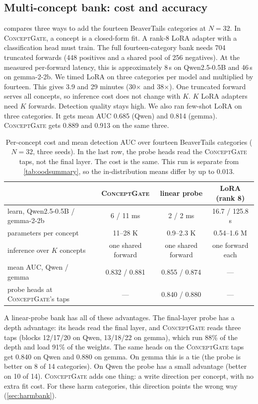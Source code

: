 \documentclass[11pt]{article}
\newcommand{\cg}{\textsc{ConceptGate}}
\begin{document}
\subsection{Multi-concept bank: cost and accuracy}
\label{sec:bank}
 compares three ways to add the fourteen BeaverTails categories at $N=32$. In \cg{}, a
concept is a closed-form fit. A rank-8 LoRA adapter with a classification head must train. The full
fourteen-category bank needs 704 truncated forwards (448 positives and a shared pool of 256 negatives).
At the measured per-forward latency, this is approximately 8\,s on Qwen2.5-0.5B and 46\,s on gemma-2-2b. We timed LoRA on three categories
per model and multiplied by fourteen. This gives 3.9 and 29 minutes (30$\times$ and 38$\times$). One truncated forward serves all concepts, so inference cost does not change with $K$. $K$ LoRA adapters need $K$ forwards. Detection quality stays high. We also ran
few-shot LoRA on three categories. It gets mean AUC 0.685 (Qwen) and 0.814 (gemma). \cg{} gets 0.889 and
0.913 on the same three.

\begin{table}[t]
\centering
\footnotesize\setlength{\tabcolsep}{4pt}
\caption{Per-concept cost and mean detection AUC over fourteen BeaverTails categories ($N=32$, three
seeds). In the last row, the probe heads read the \cg{} taps, not the final layer. The cost is the same.
This run is separate from \cref{tab:oodsummary}, so the in-distribution means differ by up to 0.013.}
\label{tab:bank}
\begin{tabular}{lccc}
\toprule
 & \cg{} & linear probe & LoRA (rank 8) \\
\midrule
learn, Qwen2.5-0.5B / gemma-2-2b & 6 / 11 ms & 2 / 2 ms & 16.7 / 125.8 s \\
parameters per concept & 11--28 K & 0.9--2.3 K & 0.54--1.6 M \\
inference over $K$ concepts & one shared forward & one shared forward & one forward each \\
mean AUC, Qwen / gemma & 0.832 / 0.881 & 0.855 / 0.874 & --- \\
probe heads at \cg{}'s taps & --- & 0.840 / 0.880 & --- \\
\bottomrule
\end{tabular}
\end{table}

A linear-probe bank has all of these advantages. The final-layer probe has a depth advantage: its heads
read the final layer, and \cg{} reads three taps (blocks 12/17/20 on Qwen, 13/18/22 on
gemma), which run 88\% of the depth and load 91\% of the weights. The
same heads on the \cg{} taps get 0.840 on Qwen and 0.880 on gemma. On
gemma this is a tie (the probe is better on 8 of 14 categories). On Qwen the probe has a small advantage
(better on 10 of 14). \cg{} adds one thing: a write direction per concept, with no extra fit cost. For
these harm categories, this direction points the wrong way (\cref{sec:harmbank}).
\end{document}
